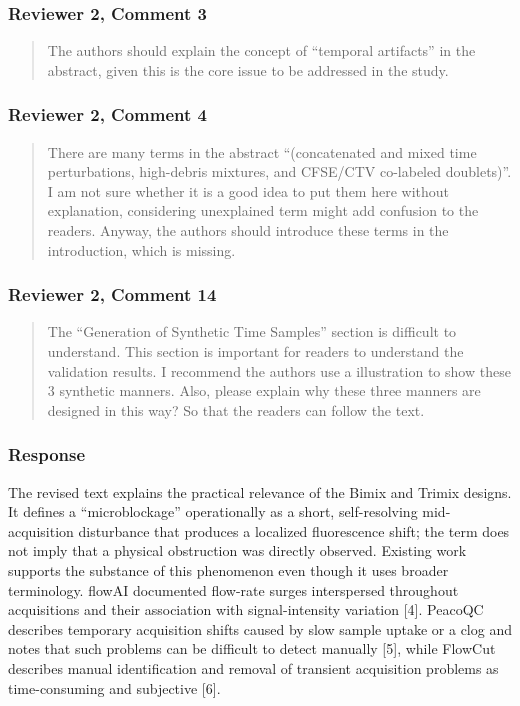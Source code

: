 \documentclass[
  11pt,
  a4paper,
]{article}
\begin{document}
\subsubsection{Reviewer 2, Comment 3}\label{reviewer-2-comment-3}

\begin{quote}
The authors should explain the concept of ``temporal artifacts'' in the
abstract, given this is the core issue to be addressed in the study.
\end{quote}

\subsubsection{Reviewer 2, Comment 4}\label{reviewer-2-comment-4}

\begin{quote}
There are many terms in the abstract ``(concatenated and mixed time
perturbations, high-debris mixtures, and CFSE/CTV co-labeled
doublets)''. I am not sure whether it is a good idea to put them here
without explanation, considering unexplained term might add confusion to
the readers. Anyway, the authors should introduce these terms in the
introduction, which is missing.
\end{quote}

\subsubsection{Reviewer 2, Comment 14}\label{reviewer-2-comment-14}

\begin{quote}
The ``Generation of Synthetic Time Samples'' section is difficult to
understand. This section is important for readers to understand the
validation results. I recommend the authors use a illustration to show
these 3 synthetic manners. Also, please explain why these three manners
are designed in this way? So that the readers can follow the text.
\end{quote}

\subsubsection{Response}\label{response-8}

The revised text explains the practical relevance of the Bimix and
Trimix designs. It defines a ``microblockage'' operationally as a short,
self-resolving mid-acquisition disturbance that produces a localized
fluorescence shift; the term does not imply that a physical obstruction
was directly observed. Existing work supports the substance of this
phenomenon even though it uses broader terminology. flowAI documented
flow-rate surges interspersed throughout acquisitions and their
association with signal-intensity variation {[}4{]}. PeacoQC describes
temporary acquisition shifts caused by slow sample uptake or a clog and
notes that such problems can be difficult to detect manually {[}5{]},
while FlowCut describes manual identification and removal of transient
acquisition problems as time-consuming and subjective {[}6{]}.
\end{document}
